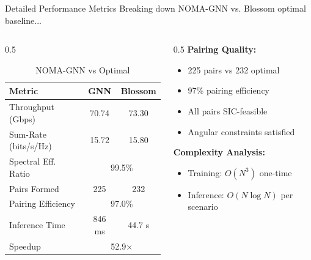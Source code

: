 \documentclass[aspectratio=169]{beamer}
\begin{document}
\begin{frame}{Detailed Performance Metrics}
    \vspace{-0.2cm}
    \small \textcolor{iiitblue}{Breaking down NOMA-GNN vs. Blossom optimal baseline...}
    
    \begin{columns}
        \begin{column}{0.5\textwidth}
            \begin{table}
                \centering
                \small
                \begin{tabular}{lcc}
                    \toprule
                    \textbf{Metric} & \textbf{GNN} & \textbf{Blossom} \\
                    \midrule
                    Throughput (Gbps) & 70.74 & 73.30 \\
                    Sum-Rate (bits/s/Hz) & 15.72 & 15.80 \\
                    Spectral Eff. Ratio & \multicolumn{2}{c}{99.5\%} \\
                    \midrule
                    Pairs Formed & 225 & 232 \\
                    Pairing Efficiency & \multicolumn{2}{c}{97.0\%} \\
                    \midrule
                    Inference Time & 846 ms & 44.7 s \\
                    Speedup & \multicolumn{2}{c}{52.9×} \\
                    \bottomrule
                \end{tabular}
                \caption{NOMA-GNN vs Optimal}
            \end{table}
        \end{column}
        \begin{column}{0.5\textwidth}
            \textbf{Pairing Quality:}
            \begin{itemize}
                \item 225 pairs vs 232 optimal
                \item 97\% pairing efficiency
                \item All pairs SIC-feasible
                \item Angular constraints satisfied
            \end{itemize}
            
            \vspace{0.3cm}
            
            \textbf{Complexity Analysis:}
            \begin{itemize}
                \item Training: $O(N^3)$ one-time
                \item Inference: $O(N \log N)$ per scenario
            \end{itemize}
        \end{column}
    \end{columns}
    

\end{frame}
\end{document}

